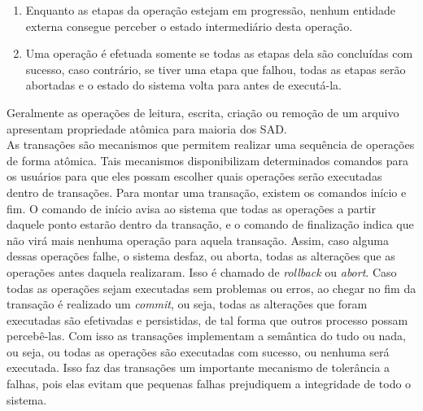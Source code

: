 	\begin{enumerate}
	\item Enquanto as etapas da operação estejam em progressão, nenhum entidade externa consegue perceber o estado intermediário desta operação.
	\item Uma operação é efetuada somente se todas as etapas dela são concluídas com sucesso, caso contrário, se tiver uma etapa que falhou, todas as etapas serão abortadas e o estado do sistema volta para antes de executá-la.
	\end{enumerate}
	
	Geralmente as operações de leitura, escrita, criação ou remoção de um arquivo apresentam propriedade atômica para maioria dos SAD.
	\\
	
	As transações são mecanismos que permitem realizar uma sequência de operações de forma atômica. Tais mecanismos disponibilizam determinados comandos para os usuários para que eles possam escolher quais operações serão executadas dentro de transações. Para montar uma transação, existem os comandos início e fim. O comando de início avisa ao sistema que todas as operações a partir daquele ponto estarão dentro da transação, e o comando de finalização indica que não virá mais nenhuma operação para aquela transação.
	Assim, caso alguma dessas operações falhe, o sistema desfaz, ou aborta, todas as alterações que as operações antes daquela realizaram. Isso é chamado de \textit{rollback} ou \textit{abort}. Caso todas as operações sejam executadas sem problemas ou erros, ao chegar no fim da transação é realizado um \textit{commit}, ou seja, todas as alterações que foram executadas são efetivadas e persistidas, de tal forma que outros processo possam percebê-las. Com isso as transações implementam a semântica do tudo ou nada, ou seja, ou todas as operações são executadas com sucesso, ou nenhuma será executada. Isso faz das transações um importante mecanismo de tolerância a falhas, pois elas evitam que pequenas falhas prejudiquem a integridade de todo o sistema.
	
